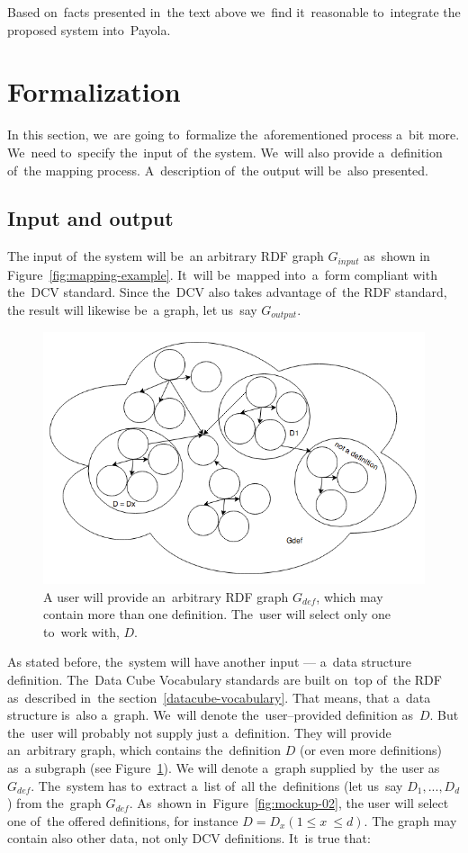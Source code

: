 Based on~facts presented in~the text above we~find it~reasonable to~integrate 
the proposed system into~Payola.

\section{Formalization}

In this section, we~are going to~formalize the~aforementioned process a~bit 
more. We~need to~specify the~input of~the system. We~will also 
provide a~definition of~the mapping process. A~description of~the output will be~also presented.

\subsection{Input and output}

The input of~the system will be~an arbitrary RDF graph $G_{input}$ as~shown
in Figure~\ref{fig:mapping-example}. It~will be~mapped into~a~form compliant
with the~DCV standard. Since the~DCV also takes advantage of~the RDF standard,
the result will likewise be~a graph, let us~say $G_{output}$.

\begin{figure}
	\centering
	\includegraphics[width=120mm]{img/definition-in-graph.png}
	\caption{A user will provide an~arbitrary RDF graph $G_{def}$, which may contain more than one definition. The~user will select only one to~work with, $D$.}
	\label{fig:definition-in-graph}
\end{figure}

As stated before, the~system will have another input --- a~data structure 
definition. The~Data Cube Vocabulary standards are built on~top of~the RDF as~described in~the 
section~\ref{datacube-vocabulary}. That means, that a~data structure is~also a~graph. We~will denote the~user--provided definition as~$D$. But the~user will probably not 
supply just a~definition. They will provide an~arbitrary graph, which contains the~definition $D$ 
(or even more definitions) as~a subgraph (see Figure~\ref{fig:definition-in-graph}).
We will denote a~graph
supplied by~the user as~$G_{def}$. The~system has to~extract a~list of~all the~definitions
(let us~say $D_1, ..., D_d$) from the~graph $G_{def}$. As~shown in~Figure~\ref{fig:mockup-02},
the user will select one of~the offered definitions, for instance $D = D_x (1 \leq x~\leq d)$.
The graph may contain also other data, not only DCV definitions. It~is true 
that:\\

